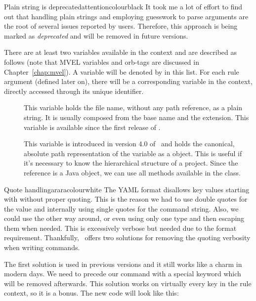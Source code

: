 \begin{description}
\begin{description}
\begin{messagebox}{Plain string is deprecated}{attentioncolour}{\icattention}{black}
It took me a lot of effort to find out that handling plain strings and employing guesswork to parse arguments are the root of several issues reported by users. Therefore, this approach is being marked as \emph{deprecated} and will be removed in future versions.
\end{messagebox}

There are at least two variables available in the  context and are described as follows (note that \gls{MVEL} variables and \glspl{orb-tag} are discussed in Chapter~\ref{chap:mvel}). A variable will be denoted by  in this list. For each rule argument (defined later on), there will be a corresponding variable in the  context, directly accessed through its unique identifier.

\begin{description}
\item[] This variable holds the file name, without any path reference, as a plain string. It is usually composed from the base name and the extension. This variable is available since the first release of \arara.

\item[] This variable is introduced in version 4.0 of \arara\ and holds the canonical, absolute path representation of the  variable as a  object. This is useful if it's necessary to know the hierarchical structure of a project. Since the reference is a Java object, we can use all methods available in the  class.
\end{description}

\begin{messagebox}{Quote handling}{araracolour}{\icinfo}{white}
\setlength{\parskip}{1em}
The \gls{YAML} format disallows key values starting with  without proper quoting. This is the reason we had to use double quotes for the value and internally using single quotes for the command string. Also, we could use the other way around, or even using only one type and then escaping them when needed. This is excessively verbose but needed due to the format requirement. Thankfully, \arara\ offers two solutions for removing the quoting verbosity when writing commands.

The first solution is used in previous versions and it still works like a charm in modern days. We need to precede our command with a special keyword  which will be removed afterwards. This solution works on virtually every key in the rule context, so it is a bonus. The new code will look like this:


\end{messagebox}
\end{description}
\end{description}
